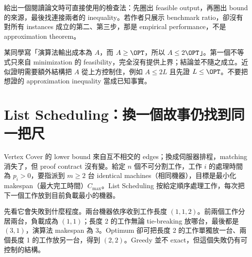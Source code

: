 \documentclass[11pt,a4paper,oneside,openany]{book}
\begin{document}
 給出一個閱讀論文時可直接使用的檢查法：先圈出 feasible output，再圈出 bound 的來源，最後找連接兩者的 inequality。若作者只展示 benchmark ratio，卻沒有對所有 instances 成立的第二、第三步，那是 empirical performance，不是 approximation theorem。

\begin{misconception}
某同學寫「演算法輸出成本為 $A$，而 $A\ge\OPT$，所以 $A\le2\OPT$」。第一個不等式只來自 minimization 的 feasibility，完全沒有提供上界；結論並不隨之成立。近似證明需要額外結構把 $A$ 從上方控制住，例如 $A\le2L$ 且先證 $L\le\OPT$。不要把想證的 approximation inequality 當成已知事實。
\end{misconception}

\section{List Scheduling：換一個故事仍找到同一把尺}
Vertex Cover 的 lower bound 來自互不相交的 edges；換成伺服器排程，matching 消失了，但 proof contract 沒有變。給定 $n$ 個不可分割工作，工作 $i$ 的處理時間為 $p_i>0$，要指派到 $m\ge2$ 台 identical machines（相同機器），目標是最小化 makespan（最大完工時間）$C_{\max}$。List Scheduling 按給定順序處理工作，每次把下一個工作放到目前負載最小的機器。

先看它會失敗到什麼程度。兩台機器依序收到工作長度 $(1,1,2)$。前兩個工作分居兩台，負載成為 $(1,1)$；長度 2 的工作無論 tie-breaking 放哪台，最後都是 $(3,1)$，演算法 makespan 為 3。Optimum 卻可把長度 2 的工作單獨放一台、兩個長度 1 的工作放另一台，得到 $(2,2)$。Greedy 並不 exact，但這個失敗仍有可控制的結構。
\end{document}
